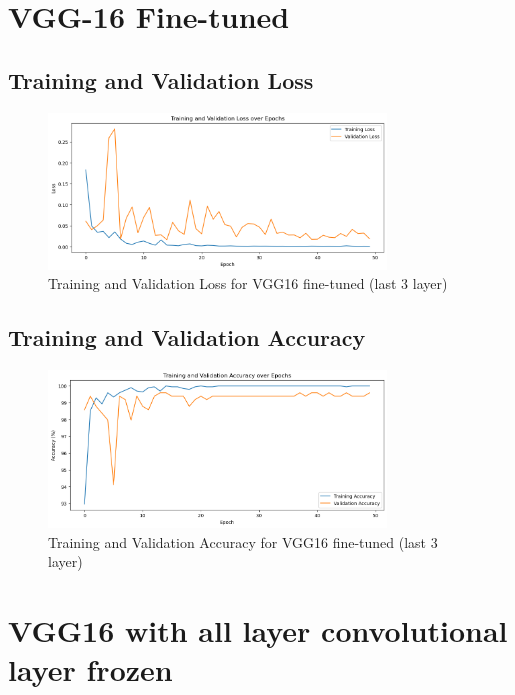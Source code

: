 \documentclass{report} %
\begin{document}
\section{VGG-16 Fine-tuned}

\subsection{Training and Validation Loss}

\begin{figure}[H]
\centering
\includegraphics[width=0.8\textwidth]{train_val_loss_vgg16_uf.png}
\caption{Training and Validation Loss for VGG16 fine-tuned (last 3 layer)}
\end{figure}



\subsection{Training and Validation Accuracy}

\begin{figure}[H]
\centering
\includegraphics[width=0.8\textwidth]{train_val_acc_vgg16_uf.png}
\caption{Training and Validation Accuracy for VGG16 fine-tuned (last 3 layer)}
\end{figure}


\section{VGG16 with all layer convolutional  layer frozen}
\end{document}
